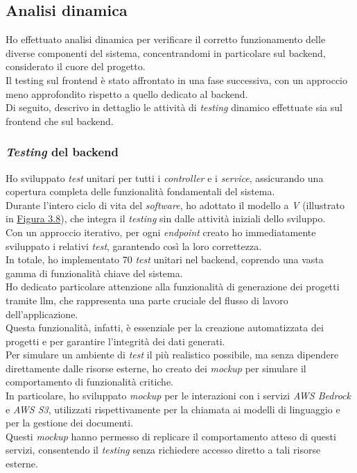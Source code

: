 \subsection{Analisi dinamica}
\label{subsec:analisi-dinamica}


Ho effettuato analisi dinamica per verificare il corretto funzionamento delle diverse componenti del sistema, concentrandomi in particolare sul \gls{backend}, considerato il cuore del progetto. \\
Il testing sul \gls{frontend} è stato affrontato in una fase successiva, con un approccio meno approfondito rispetto a quello dedicato al \gls{backend}.\\

\noindent Di seguito, descrivo in dettaglio le attività di \textit{testing} dinamico effettuate sia sul \gls{frontend} che sul \gls{backend}.
\pagebreak
\subsubsection{\textit{Testing} del \gls{backend}}

Ho sviluppato \textit{test} unitari per tutti i \textit{controller} e i \textit{service}, assicurando una copertura completa delle funzionalità fondamentali del sistema.\\

\noindent Durante l'intero ciclo di vita del \textit{software}, ho adottato il modello a \textit{V} (illustrato in {\hyperref[fig:v-model]{Figura 3.8}}), che integra il \textit{testing} sin dalle attività iniziali dello sviluppo. \\
Con un approccio iterativo, per ogni \textit{endpoint} creato ho immediatamente sviluppato i relativi \textit{test}, garantendo così la loro correttezza.\\

\noindent In totale, ho implementato 70 \textit{test} unitari nel \gls{backend}, coprendo una vasta gamma di funzionalità chiave del sistema.\\
Ho dedicato particolare attenzione alla funzionalità di generazione dei progetti tramite \gls{llm}, che rappresenta una parte cruciale del flusso di lavoro dell'applicazione.\\
 Questa funzionalità, infatti, è essenziale per la creazione automatizzata dei progetti e per garantire l'integrità dei dati generati.\\

\noindent Per simulare un ambiente di \textit{test} il più realistico possibile, ma senza dipendere direttamente dalle risorse esterne, ho creato dei \textit{mockup} per simulare il comportamento di funzionalità critiche.\\
In particolare, ho sviluppato \textit{mockup} per le interazioni con i servizi \textit{AWS Bedrock} e \textit{AWS S3}, utilizzati rispettivamente per la chiamata ai modelli di linguaggio e per la gestione dei documenti.\\
Questi \textit{mockup} hanno permesso di replicare il comportamento atteso di questi servizi, consentendo il \textit{testing} senza richiedere accesso diretto a tali risorse esterne.\\

